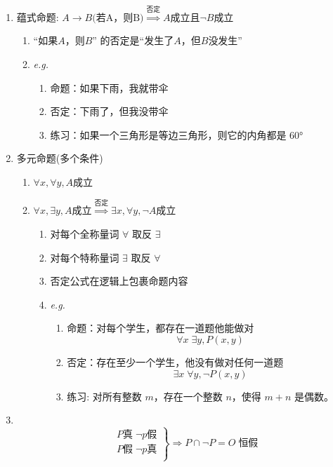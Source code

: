 \documentclass[a4paper,12pt]{article}
\begin{document}
\begin{enumerate}
\begin{enumerate}
        \end{enumerate}
        \item 蕴式命题: $A \rightarrow B \text{(若A，则B)} \overset{\text{否定}}{\Rightarrow} A\text{成立且} \neg{B}\text{成立}$
        \begin{enumerate}
            \item “如果$A$，则$B$” 的否定是“发生了$A$，但$B$没发生”
            \item \emph{e.g.}
            \begin{enumerate}
                \item 命题：如果下雨，我就带伞
                \item 否定：下雨了，但我没带伞
                \item 练习：如果一个三角形是等边三角形，则它的内角都是 60°
            \end{enumerate}
        \end{enumerate}
        \item 多元命题(多个条件)
        \begin{enumerate}
            \item $\forall x, \forall y, A \text{成立} $
            \item $\forall x, \exists y, A \text{成立} \overset{\text{否定}}{\Rightarrow} \exists x, \forall y, \neg{A}\text{成立}$
            \begin{enumerate}
                \item 对每个全称量词 $\forall$ 取反 \rightarrow {} \; $\exists$
                \item 对每个特称量词 $\exists$ 取反 \rightarrow {} \; $\forall$
                \item 否定公式在逻辑上包裹命题内容
                \item \emph{e.g.}
                \begin{enumerate}
                    \item 命题：对每个学生，都存在一道题他能做对
                    \[
                        \forall x \; \exists y, P(x, y)
                    \]
                    \item 否定：存在至少一个学生，他没有做对任何一道题
                    \[
                        \exists x \; \forall y, \neg{P(x, y)}
                    \]
                    \item 练习: 对所有整数 $m$，存在一个整数 $n$，使得 $m + n$ 是偶数。
                \end{enumerate}
            \end{enumerate}
        \end{enumerate}
        \item $$
        \[
            \left.
            \begin{array}{l}
                P\text{真} \; \neg{p} \text{假} \\
                P\text{假} \; \neg{p} \text{真} \\
            \end{array}
            \right\} \Rightarrow P \cap \neg{P} = O \; \text{恒假}
        \]
    \end{enumerate}
\end{document}
